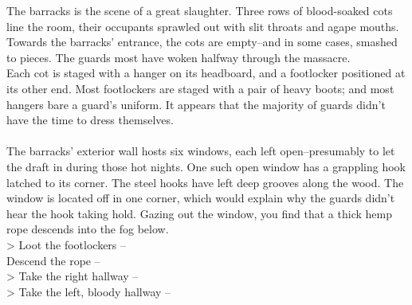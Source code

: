 The barracks is the scene of a great slaughter. Three rows of blood-soaked cots line the room, their occupants sprawled out with slit throats and agape mouths. Towards the barracks' entrance, the cots are empty--and in some cases, smashed to pieces. The guards most have woken halfway through the massacre.\\

Each cot is staged with a hanger on its headboard, and a footlocker positioned at its other end. Most footlockers are staged with a pair of heavy boots; and most hangers bare a guard's uniform. It appears that the majority of guards didn't have the time to dress themselves.\\
\\

The barracks' exterior wall hosts six windows, each left open--presumably to let the draft in during those hot nights. One such open window has a grappling hook latched to its corner. The steel hooks have left deep grooves along the wood. The window is located off in one corner, which would explain why the guards didn't hear the hook taking hold. Gazing out the window, you find that a thick hemp rope descends into the fog below.\\

> Loot the footlockers -- \\
 Descend the rope -- \\
> Take the right hallway -- \\
> Take the left, bloody hallway -- 